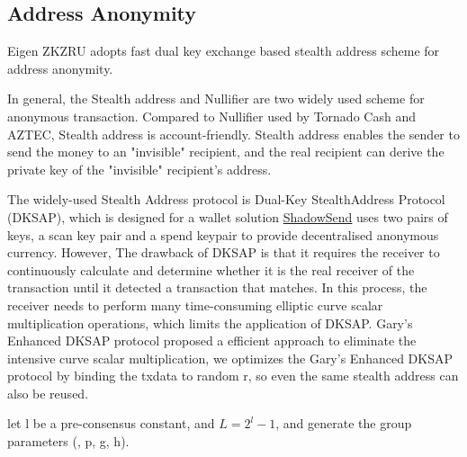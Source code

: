 
\subsection{Address Anonymity}

Eigen ZKZRU adopts fast dual key exchange based stealth address scheme for address anonymity. 

In general, the Stealth address and Nullifier are two widely used scheme for anonymous
transaction. Compared to Nullifier used by Tornado Cash and AZTEC, Stealth address is account-friendly. Stealth address enables the sender to send the money to an "invisible" recipient, and the real recipient can derive the private key of the "invisible" recipient's address. 

The widely-used Stealth Address protocol is Dual-Key StealthAddress Protocol (DKSAP), which is designed for a wallet solution \href{https://github.com/shadowproject}{ShadowSend} uses two pairs of keys, a scan key pair and a spend keypair to provide decentralised anonymous currency. However, The drawback of DKSAP is that it requires the receiver to continuously calculate and determine whether it is the real receiver of the transaction until it detected a transaction that matches. In this process, the receiver needs to perform many time-consuming elliptic curve scalar multiplication operations, which limits the application of DKSAP. Gary's Enhanced DKSAP protocol \cite{Yu2020BlockchainSA} proposed a efficient approach to eliminate the intensive curve scalar multiplication, we optimizes the Gary's Enhanced DKSAP protocol by binding the txdata to random r, so even the same stealth address can also be reused. 

let l be a pre-consensus constant, and $L = 2^l - 1$, and generate the group parameters (\GG, p, g, h).

